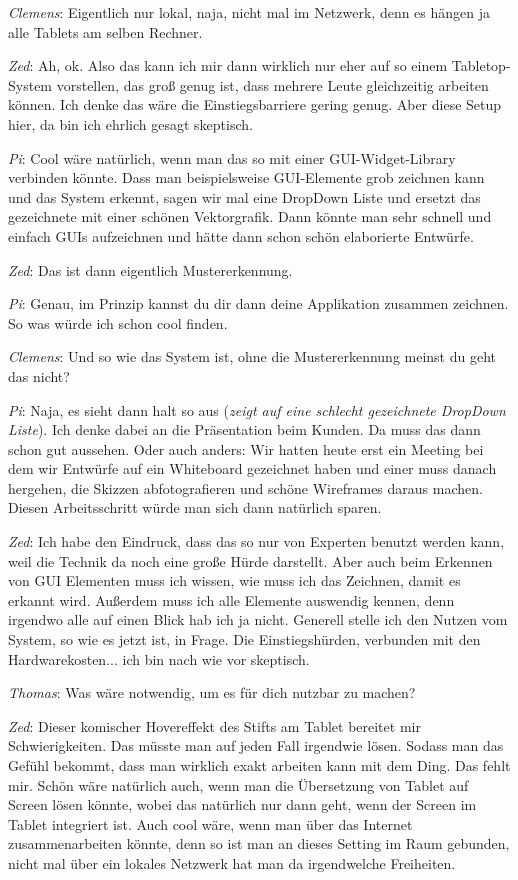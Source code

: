\medskip \emph{Clemens}: Eigentlich nur lokal, naja, nicht mal im Netzwerk, denn es hängen ja alle Tablets am selben Rechner.

\medskip \emph{Zed}: Ah, ok. Also das kann ich mir dann wirklich nur eher auf so einem Tabletop-System vorstellen, das groß genug ist, dass mehrere Leute gleichzeitig arbeiten können. Ich denke das wäre die Einstiegsbarriere gering genug. Aber diese Setup hier, da bin ich ehrlich gesagt skeptisch.

\medskip \emph{Pi}: Cool wäre natürlich, wenn man das so mit einer \ac{GUI}-Widget-Library verbinden könnte. Dass man beispielsweise \ac{GUI}-Elemente grob zeichnen kann und das System erkennt, sagen wir mal eine DropDown Liste und ersetzt das gezeichnete mit einer schönen Vektorgrafik. Dann könnte man sehr schnell und einfach \acp{GUI} aufzeichnen und hätte dann schon schön elaborierte Entwürfe.

\medskip \emph{Zed}: Das ist dann eigentlich Mustererkennung.

\medskip \emph{Pi}: Genau, im Prinzip kannst du dir dann deine Applikation zusammen zeichnen. So was würde ich schon cool finden.

\medskip \emph{Clemens}: Und so wie das System ist, ohne die Mustererkennung meinst du geht das nicht?

\medskip \emph{Pi}: Naja, es sieht dann halt so aus (\emph{zeigt auf eine schlecht gezeichnete DropDown Liste}). Ich denke dabei an die Präsentation beim Kunden. Da muss das dann schon gut aussehen. Oder auch anders: Wir hatten heute erst ein Meeting bei dem wir Entwürfe auf ein Whiteboard gezeichnet haben und einer muss danach hergehen, die Skizzen abfotografieren und schöne Wireframes daraus machen. Diesen Arbeitsschritt würde man sich dann natürlich sparen.

\medskip \emph{Zed}: Ich habe den Eindruck, dass das so nur von Experten benutzt werden kann, weil die Technik da noch eine große Hürde darstellt. Aber auch beim Erkennen von \ac{GUI} Elementen muss ich wissen, wie muss ich das Zeichnen, damit es erkannt wird. Außerdem muss ich alle Elemente auswendig kennen, denn irgendwo alle auf einen Blick hab ich ja nicht. Generell stelle ich den Nutzen vom System, so wie es jetzt ist, in Frage. Die Einstiegshürden, verbunden mit den Hardwarekosten... ich bin nach wie vor skeptisch.

\medskip \emph{Thomas}: Was wäre notwendig, um es für dich nutzbar zu machen?

\medskip \emph{Zed}: Dieser komischer Hovereffekt des Stifts am Tablet bereitet mir Schwierigkeiten. Das müsste man auf jeden Fall irgendwie lösen. Sodass man das Gefühl bekommt, dass man wirklich exakt arbeiten kann mit dem Ding. Das fehlt mir. Schön wäre natürlich auch, wenn man die Übersetzung von Tablet auf Screen lösen könnte, wobei das natürlich nur dann geht, wenn der Screen im Tablet integriert ist. Auch cool wäre, wenn man über das Internet zusammenarbeiten könnte, denn so ist man an dieses Setting im Raum gebunden, nicht mal über ein lokales Netzwerk hat man da irgendwelche Freiheiten.

